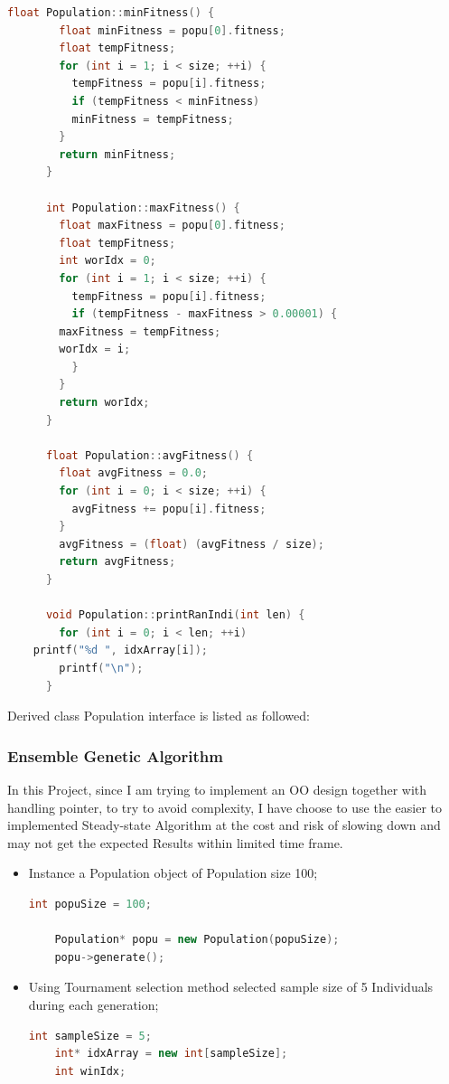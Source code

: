 \documentclass{article}
\begin{document}
\begin{CJK}{UTF8}{gbsn}
\begin{itemize}
\begin{lstlisting}[language=c++]
      float Population::minFitness() {
        float minFitness = popu[0].fitness;
        float tempFitness;
        for (int i = 1; i < size; ++i) {
          tempFitness = popu[i].fitness;
          if (tempFitness < minFitness)
          minFitness = tempFitness;
        }
        return minFitness;
      }

      int Population::maxFitness() {
        float maxFitness = popu[0].fitness;
        float tempFitness;
        int worIdx = 0;
        for (int i = 1; i < size; ++i) {
          tempFitness = popu[i].fitness;
          if (tempFitness - maxFitness > 0.00001) {
	    maxFitness = tempFitness;
	    worIdx = i;
          }
        }
        return worIdx;
      }

      float Population::avgFitness() {
        float avgFitness = 0.0;
        for (int i = 0; i < size; ++i) {
          avgFitness += popu[i].fitness;
        }
        avgFitness = (float) (avgFitness / size);
        return avgFitness;
      }

      void Population::printRanIndi(int len) {
        for (int i = 0; i < len; ++i)
	printf("%d ", idxArray[i]);
        printf("\n");
      }
    \end{lstlisting}
  \end{itemize}

  Derived class Population interface is listed as followed: 
  

\subsubsection{Ensemble Genetic Algorithm}
In this Project, since I am trying to implement an OO design together with handling pointer, to try to avoid complexity, I have choose to use the easier to implemented Steady-state Algorithm at the cost and risk of slowing down and may not get the expected Results within limited time frame.

\begin{itemize}
  \itemsep=-3pt
\item Instance a Population object of Population size 100;
  \begin{lstlisting}[language=c++]
    int popuSize = 100;

    Population* popu = new Population(popuSize);
    popu->generate();
  \end{lstlisting}

\item Using Tournament selection method selected sample size of 5 Individuals during each generation; 
  \begin{lstlisting}[language=c++]
    int sampleSize = 5;
    int* idxArray = new int[sampleSize];
    int winIdx;


\end{lstlisting}
\end{itemize}
\end{CJK}
\end{document}
